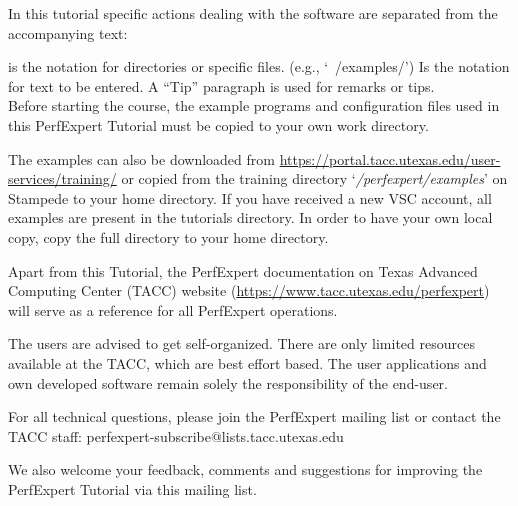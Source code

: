 
In this tutorial specific actions dealing with the software are separated from the accompanying text:

\begin{prompt}
\end{prompt}

 is the notation for directories or specific files. (e.g., `~/examples/')
 Is the notation for text to be entered.
 A ``Tip'' paragraph is used for remarks or tips.
 \\

Before starting the course, the example programs and configuration files used in this PerfExpert Tutorial must be copied to your own work directory.

\iftacc
The examples can also be downloaded from \url{https://portal.tacc.utexas.edu/user-services/training/} or copied from the training directory  `\emph{\tutorialdir/perfexpert/examples}' on Stampede to your home directory.
\fi
\ifvsc
If you have received a new VSC account, all examples are present in the tutorials directory. In order to have your own local copy, copy the full directory to your home directory.
\fi

\begin{prompt}
\end{prompt}

Apart from this Tutorial, the PerfExpert documentation on Texas Advanced Computing Center (TACC) website (\url{https://www.tacc.utexas.edu/perfexpert}) will serve as a reference for all PerfExpert operations.

 The users are advised to get self-organized. There are only limited resources available at the TACC, which are best effort based. The user applications and own developed software remain solely the responsibility of the end-user.


For all technical questions, please join the PerfExpert mailing list or contact the TACC staff: perfexpert-subscribe@lists.tacc.utexas.edu

We also welcome your feedback, comments and suggestions for improving the PerfExpert Tutorial via this mailing list.

